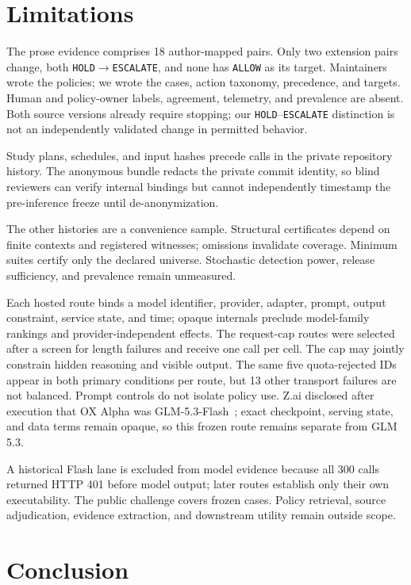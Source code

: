 \documentclass[10pt]{article}
\newcommand{\allow}{\texttt{ALLOW}}
\newcommand{\hold}{\texttt{HOLD}}
\newcommand{\escalate}{\texttt{ESCALATE}}
\begin{document}
\section{Limitations}

The prose evidence comprises 18 author-mapped pairs. Only two extension pairs change, both
\hold$\rightarrow$\escalate{}, and none has \allow{} as its target. Maintainers wrote the policies;
we wrote the cases, action taxonomy, precedence, and targets. Human and policy-owner labels,
agreement, telemetry, and prevalence are absent. Both source versions already require stopping;
our \hold{}--\escalate{} distinction is not an independently validated change in permitted behavior.

Study plans, schedules, and input hashes precede calls in the private repository history. The
anonymous bundle redacts the private commit identity, so blind reviewers can verify internal
bindings but cannot independently timestamp the pre-inference freeze until de-anonymization.

The other histories are a convenience sample. Structural certificates depend on finite contexts and
registered witnesses; omissions invalidate coverage. Minimum suites certify only the declared
universe. Stochastic detection power, release sufficiency, and prevalence remain unmeasured.

Each hosted route binds a model identifier, provider, adapter, prompt, output constraint, service
state, and time; opaque internals preclude model-family rankings and provider-independent effects.
The request-cap routes were selected after a screen for length failures and receive one call per
cell. The cap may jointly constrain hidden reasoning and visible output. The same five
quota-rejected IDs appear in both primary conditions per route, but 13 other transport failures are
not balanced. Prompt controls do not isolate policy use. Z.ai disclosed after execution that OX
Alpha was GLM-5.3-Flash~\cite{zai2026glm53flash}; exact checkpoint, serving state, and data terms
remain opaque, so this frozen route remains separate from GLM 5.3.

A historical Flash lane is excluded from model evidence because all 300 calls returned HTTP 401
before model output; later routes establish only their own executability. The public challenge
covers frozen cases. Policy retrieval, source adjudication, evidence extraction, and downstream
utility remain outside scope.

\section{Conclusion}
\end{document}
